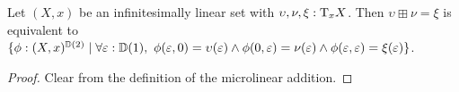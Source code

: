 \begin{lemma}\label{prp:microlinear-addition}
Let $(X,x)$ be an infinitesimally linear set with $\upsilon,\nu,\xi:\tangent{X}{x}$. Then $\upsilon \boxplus \nu = \xi$ is equivalent to $\setbuild{\phi : (X,x)^{\D(2)}}{\forall \varepsilon:\D(1),\ \phi(\varepsilon,0) = \upsilon(\varepsilon) \land \phi(0,\varepsilon)=\nu(\varepsilon) \land \phi(\varepsilon,\varepsilon)=\xi(\varepsilon)}$.
\end{lemma}

\begin{proof}
Clear from the definition of the microlinear addition.
\end{proof}







